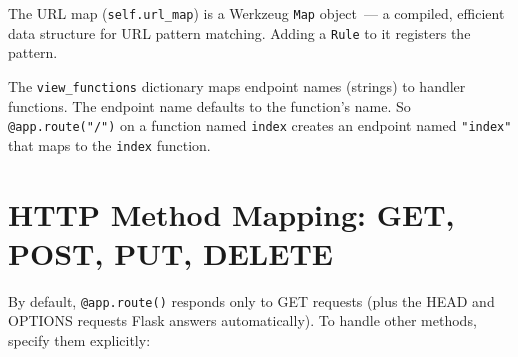 \noindent{}The URL map (\texttt{self.url\_map}) is a Werkzeug \texttt{Map} object~--- a compiled, efficient data structure for URL pattern matching. Adding a \texttt{Rule} to it registers the pattern.

The \texttt{view\_functions} dictionary maps endpoint names (strings) to handler functions. The endpoint name defaults to the function's name. So \texttt{@app.route("/")} on a function named \texttt{index} creates an endpoint named \texttt{"index"} that maps to the \texttt{index} function.

\setcounter{section}{2}
\section{HTTP Method Mapping: GET, POST, PUT, DELETE}\label{04-request-handling-paths:43-http-method-mapping-get-post-put-delete}

By default, \texttt{@app.route()} responds only to GET requests (plus the HEAD and OPTIONS requests Flask answers automatically). To handle other methods, specify them explicitly:

